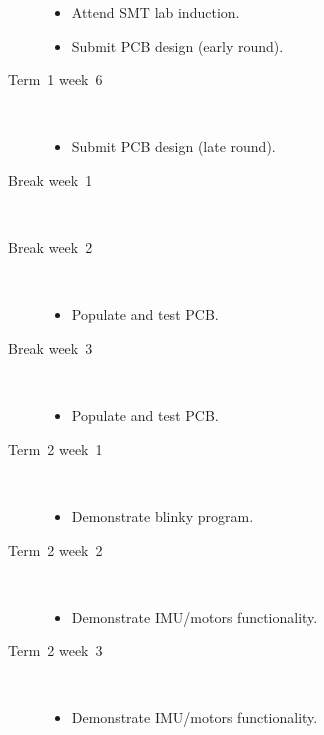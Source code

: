 \begin{description}
  \begin{itemize}
  \item Attend SMT lab induction.
  \item Submit PCB design (early round).
  \end{itemize}
  
  
\item [Term~1 week~6]\mbox{}\\  
  
  \begin{itemize}
  \item Submit PCB design (late round).
  \end{itemize}
  
  
\item [Break week~1]\mbox{}\\
  
  
\item [Break week~2]\mbox{}\\  
  
  \begin{itemize}
  \item Populate and test PCB.
  \end{itemize}
  
  
\item [Break week~3]\mbox{}\\
  
  \begin{itemize}
  \item Populate and test PCB.
  \end{itemize}  
  
  
\item [Term~2 week~1]\mbox{}\\
  
  \begin{itemize}
  \item Demonstrate blinky program.
  \end{itemize}
  
  
\item [Term~2 week~2]\mbox{}\\
  
  \begin{itemize}
  \item Demonstrate IMU/motors functionality.
  \end{itemize}
  
  
\item [Term~2 week~3]\mbox{}\\
  
  \begin{itemize}
  \item Demonstrate IMU/motors functionality.
  \end{itemize}
  

\end{description}
